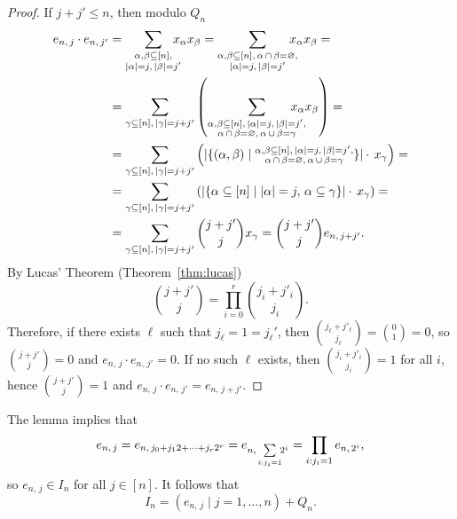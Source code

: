 \documentclass[11pt]{article}
\newcommand{\es}[2]{e_{#1,\, #2}}
\theoremstyle{plain}
\theoremstyle{definition}
\theoremstyle{remark}
\begin{document}
\begin{proof}
    If $j+j'\leq n$, then modulo $Q_n$
    \begin{align*}
        \es{n}{j}\cdot\es{n}{j'}
        &=\sum_{\substack{\alpha,\beta\subseteq[n],\\|\alpha|=j,\,|\beta|=j'}}\hspace{-0.3cm}x_\alpha x_\beta
        =\sum_{\substack{\alpha,\beta\subseteq[n],\,\alpha\,\cap\,\beta=\varnothing,\\|\alpha|=j,\,|\beta|=j'}}\hspace{-0.3cm}x_\alpha x_\beta=\\
        &=\sum_{\gamma\subseteq[n],\,|\gamma|=j+j'}\left(\sum_{\substack{\alpha,\beta\subseteq[n],\,|\alpha|=j,\,|\beta|=j',\\\alpha\,\cap\,\beta=\varnothing,\,\alpha\,\cup\,\beta=\gamma}}\hspace{-0.5cm}x_\alpha x_\beta\right)=\\
        &=\sum_{\gamma\subseteq[n],\,|\gamma|=j+j'}\left(\lvert\{(\alpha,\beta)\mid\substack{\alpha,\beta\subseteq [n],\,|\alpha|=j,\,|\beta|=j',\\\alpha\,\cap\,\beta=\varnothing,\,\alpha\,\cup\,\beta=\gamma}\}\rvert\cdot\, x_\gamma\right)=\\
        &=\sum_{\gamma\subseteq[n],\,|\gamma|=j+j'}\left(\lvert\{\alpha\subseteq [n]\mid|\alpha|=j,\,\alpha\subseteq\gamma\}\rvert\cdot\, x_\gamma\right)=\\
        &=\sum_{\gamma\subseteq[n],\,|\gamma|=j+j'}\binom{j+j'}{j}x_\gamma
        =\binom{j+j'}{j}\es{n}{j+j'}.
    \end{align*}
    By Lucas' Theorem (Theorem~\ref{thm:lucas})
    \begin{equation*}
        \binom{j+j'}{j}=\prod_{i=0}^r\binom{j_i+j'_i}{j_i}.
    \end{equation*}
    Therefore, if there exists $\ell$ such that $j_\ell=1=j_\ell'$, then $\binom{j_\ell+j'_\ell}{j_\ell}=\binom{0}{1}=0$, so $\binom{j+j'}{j}=0$ and $\es{n}{j}\cdot\es{n}{j'}=0$.
    If no such $\ell$ exists, then $\binom{j_i+j'_i}{j_i}=1$ for all $i$, hence $\binom{j+j'}{j}=1$ and $\es{n}{j}\cdot\es{n}{j'}=\es{n}{j+j'}$.
    
\end{proof}

The lemma implies that
\begin{equation}\label{eq:BuildingBlocksESP}
    \es{n}{j}=\es{n}{j_0 + j_12 + \dots + j_r2^r}
    =\es{n}{\sum\limits_{i:j_i=1}\hspace{-0.1cm}2^i}
    =\prod_{i:j_i=1}\es{n}{2^i},
\end{equation}
so $\es{n}{j}\in I_n$ for all $j\in[n]$. It follows that
\begin{equation*}
    I_n=(\es{n}{j}\mid j=1,\dots,n)+Q_n.
\end{equation*}
\end{document}
